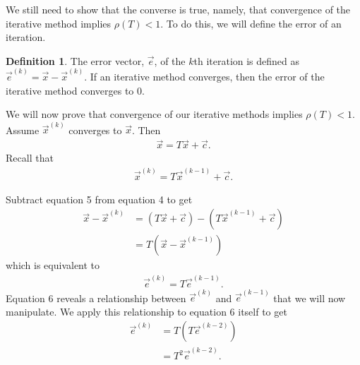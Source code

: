 \documentclass[12pt,letterpaper]{article}
\theoremstyle{definition}
\newtheorem{defn}[thm]{Definition}
\begin{document}
We still need to show that the converse is true, namely, that convergence of the iterative method implies $\rho(T) < 1$. To do this, we will define the error of an iteration.

\begin{defn}
The error vector, $\vec{e}$, of the $k$th iteration is defined as $\vec{e}^{(k)} = \vec{x} - \vec{x}^{(k)}$. If an iterative method converges, then the error of the iterative method converges to 0.
\end{defn}

\noindent We will now prove that convergence of our iterative methods implies $\rho(T) < 1$. Assume $\vec{x}^{(k)}$ converges to $\vec{x}$. Then \begin{align}\vec{x} = T\vec{x} + \vec{c}.\end{align} 
\noindent Recall that \begin{align}\vec{x}^{(k)} = T\vec{x}^{(k-1)} + \vec{c}.\end{align}  

\noindent Subtract equation 5 from equation 4 to get 
\begin{align*}\vec{x} - \vec{x}^{(k)} &= (T\vec{x} + \vec{c}) - \left(T\vec{x}^{(k-1)} + \vec{c}\right) 
\\&= T\left(\vec{x} - \vec{x}^{(k-1)}\right)\end{align*}
which is equivalent to
\begin{align} \vec{e}^{(k)} = T\vec{e}^{(k-1)}.\end{align}
Equation 6 reveals a relationship between $\vec{e}^{(k)}$ and $\vec{e}^{(k-1)}$ that we will now manipulate. We apply this relationship to equation 6 itself to get
\begin{align*} \vec{e}^{(k)} &= T(T\vec{e}^{(k-2)}) \\&= T^2\vec{e}^{(k-2)}.\end{align*}

\end{document}
